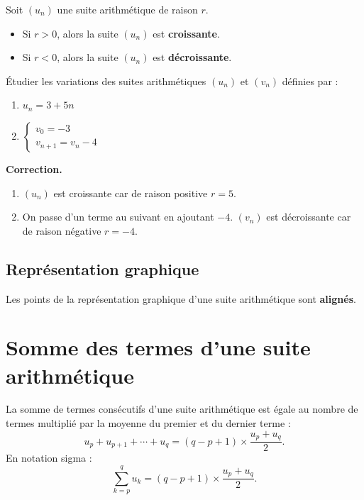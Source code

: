 \documentclass[10pt,a4paper]{article}
\newenvironment{correction}{\par\medskip\noindent\textbf{Correction.} }{\par\medskip}
\begin{document}
\begin{prop}
	Soit $(u_n)$ une suite arithmétique de raison $r$.
	\begin{itemize}
		\item Si $r > 0$, alors la suite $(u_n)$ est \textbf{croissante}.
		\item Si $r < 0$, alors la suite $(u_n)$ est \textbf{décroissante}.
	\end{itemize}
\end{prop}

\begin{meth}

	Étudier les variations des suites arithmétiques $(u_n)$ et $(v_n)$ définies par :
	\begin{enumerate}
		\item[a)] $u_n = 3 + 5n$
		\item[b)] $\begin{cases} v_0 = -3 \\ v_{n+1} = v_n - 4 \end{cases}$
	\end{enumerate}

	\begin{correction}
		\begin{enumerate}
			\item[a)] $(u_n)$ est croissante car de raison positive $r = 5$.
			\item[b)] On passe d'un terme au suivant en ajoutant $-4$. $(v_n)$ est décroissante car de raison négative $r = -4$.
		\end{enumerate}
	\end{correction}
\end{meth}

\subsection{Représentation graphique}

Les points de la représentation graphique d'une suite arithmétique sont \textbf{alignés}.

\section{Somme des termes d'une suite arithmétique}

\begin{prop}
	La somme de termes consécutifs d'une suite arithmétique est égale au nombre de termes multiplié par la moyenne du premier et du dernier terme :
	$$
		u_p + u_{p+1} + \cdots + u_q = (q - p + 1) \times \frac{u_p + u_q}{2}.
	$$
	En notation sigma :
	$$
		\sum_{k=p}^{q} u_k = (q - p + 1) \times \frac{u_p + u_q}{2}.
	$$
\end{prop}
\end{document}

